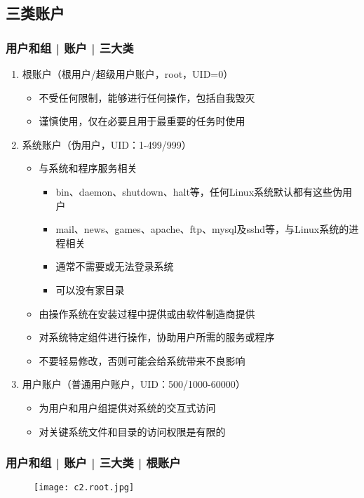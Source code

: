 \subsection{三类账户}
\begin{frame}
  \frametitle{用户和组 | 账户 | \alert{三大类}}
  \begin{enumerate}
    \item<1-> 根账户（根用户/超级用户账户，root，UID=0）
      \begin{itemize}
        \item<4-> 不受任何限制，能够进行任何操作，包括自我毁灭
        \item<5-> 谨慎使用，仅在必要且用于最重要的任务时使用
      \end{itemize}
    \item<2-> 系统账户（伪用户，UID：1-499/999）
      \begin{itemize}
        \item<6-> 与系统和程序服务相关
	  \begin{itemize}
	    \item bin、daemon、shutdown、halt等，任何Linux系统默认都有这些伪用户
	    \item mail、news、games、apache、ftp、mysql及sshd等，与Linux系统的进程相关
            \item 通常不需要或无法登录系统
            \item 可以没有家目录
	  \end{itemize}
        \item<6-> 由操作系统在安装过程中提供或由软件制造商提供
        \item<6-> 对系统特定组件进行操作，协助用户所需的服务或程序
        \item<7-> 不要轻易修改，否则可能会给系统带来不良影响
      \end{itemize}
    \item<3-> 用户账户（普通用户账户，UID：500/1000-60000）
      \begin{itemize}
        \item<8-> 为用户和用户组提供对系统的交互式访问
        \item<8-> 对关键系统文件和目录的访问权限是有限的
      \end{itemize}
  \end{enumerate}
\end{frame}

\begin{frame}
  \frametitle{用户和组 | 账户 | 三大类 | 根账户}
  \begin{figure}
    \centering
    \texttt{[image: c2.root.jpg]}
  \end{figure}
\end{frame}

